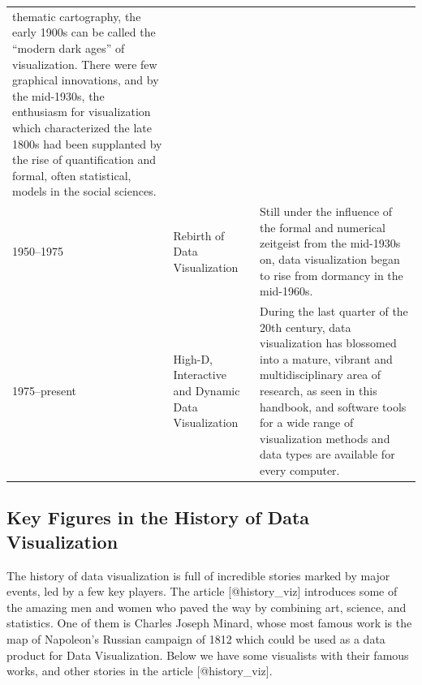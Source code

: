 \documentclass[]{book}
\theoremstyle{definition}
\theoremstyle{definition}
\theoremstyle{definition}
\theoremstyle{remark}
\begin{document}
\begin{longtable}[]{@{}lll@{}}
\begin{minipage}[t]{0.76\columnwidth}
thematic cartography, the early 1900s can be called the ``modern dark
ages'' of visualization. There were few graphical innovations, and by
the mid-1930s, the enthusiasm for visualization which characterized the
late 1800s had been supplanted by the rise of quantification and formal,
often statistical, models in the social sciences.\strut
\end{minipage}\tabularnewline
\begin{minipage}[t]{0.07\columnwidth}\raggedright\strut
1950--1975\strut
\end{minipage} & \begin{minipage}[t]{0.08\columnwidth}\raggedright\strut
Rebirth of Data Visualization\strut
\end{minipage} & \begin{minipage}[t]{0.76\columnwidth}\raggedright\strut
Still under the influence of the formal and numerical zeitgeist from the
mid-1930s on, data visualization began to rise from dormancy in the
mid-1960s.\strut
\end{minipage}\tabularnewline
\begin{minipage}[t]{0.07\columnwidth}\raggedright\strut
1975--present\strut
\end{minipage} & \begin{minipage}[t]{0.08\columnwidth}\raggedright\strut
High-D, Interactive and Dynamic Data Visualization\strut
\end{minipage} & \begin{minipage}[t]{0.76\columnwidth}\raggedright\strut
During the last quarter of the 20th century, data visualization has
blossomed into a mature, vibrant and multidisciplinary area of research,
as seen in this handbook, and software tools for a wide range of
visualization methods and data types are available for every
computer.\strut
\end{minipage}\tabularnewline
\bottomrule
\end{longtable}

\subsection{Key Figures in the History of Data
Visualization}\label{key-figures-in-the-history-of-data-visualization}

The history of data visualization is full of incredible stories marked
by major events, led by a few key players. The article
{[}@history\_viz{]} introduces some of the amazing men and women who
paved the way by combining art, science, and statistics. One of them is
Charles Joseph Minard, whose most famous work is the map of Napoleon's
Russian campaign of 1812 which could be used as a data product for Data
Visualization. Below we have some visualists with their famous works,
and other stories in the article {[}@history\_viz{]}.
\end{document}

